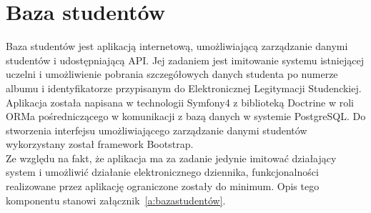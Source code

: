 \documentclass[declaration,shortabstract, mgr]{iithesis}
\begin{document}
\section{Baza studentów}
\indent Baza studentów jest aplikacją internetową, umożliwiającą zarządzanie danymi studentów i udostępniającą API. Jej zadaniem jest imitowanie systemu istniejącej uczelni i umożliwienie pobrania szczegółowych danych studenta po numerze albumu i identyfikatorze przypisanym do Elektronicznej Legitymacji Studenckiej.\\
\indent Aplikacja została napisana w technologii Symfony4\cite{symfony} z biblioteką Doctrine\cite{doctrine} w roli ORMa pośredniczącego w komunikacji z bazą danych w systemie PostgreSQL. Do stworzenia interfejsu umożliwiającego zarządzanie danymi studentów wykorzystany został framework Bootstrap.\\
\indent Ze względu na fakt, że aplikacja ma za zadanie jedynie imitować działający system i umożliwić działanie elektronicznego dziennika, funkcjonalności realizowane przez aplikację ograniczone zostały do minimum. Opis tego komponentu stanowi załącznik~\ref{a:bazastudentów}.
\end{document}
